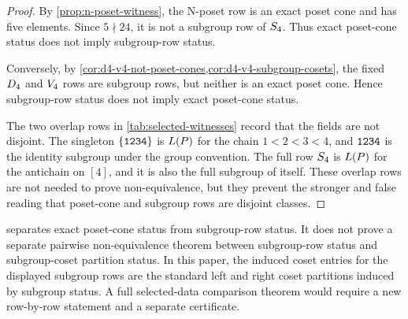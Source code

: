 \begin{proof}
By \cref{prop:n-poset-witness}, the N-poset row is an exact poset cone and has five elements. Since \(5\nmid 24\), it is not a subgroup row of \(S_4\). Thus exact poset-cone status does not imply subgroup-row status.

Conversely, by \cref{cor:d4-v4-not-poset-cones,cor:d4-v4-subgroup-cosets}, the fixed \(D_4\) and \(V_4\) rows are subgroup rows, but neither is an exact poset cone. Hence subgroup-row status does not imply exact poset-cone status.

The two overlap rows in \cref{tab:selected-witnesses} record that the fields are not disjoint. The singleton \(\{\texttt{1234}\}\) is \(L(P)\) for the chain \(1<2<3<4\), and \(\texttt{1234}\) is the identity subgroup under the group convention. The full row \(S_4\) is \(L(P)\) for the antichain on \([4]\), and it is also the full subgroup of itself. These overlap rows are not needed to prove non-equivalence, but they prevent the stronger and false reading that poset-cone and subgroup rows are disjoint classes.
\end{proof}

\begin{remark}
\label{rem:comparison-boundary}
 separates exact poset-cone status from subgroup-row status. It does not prove a separate pairwise non-equivalence theorem between subgroup-row status and subgroup-coset partition status. In this paper, the induced coset entries for the displayed subgroup rows are the standard left and right coset partitions induced by subgroup status. A full selected-data comparison theorem would require a new row-by-row statement and a separate certificate.
\end{remark}